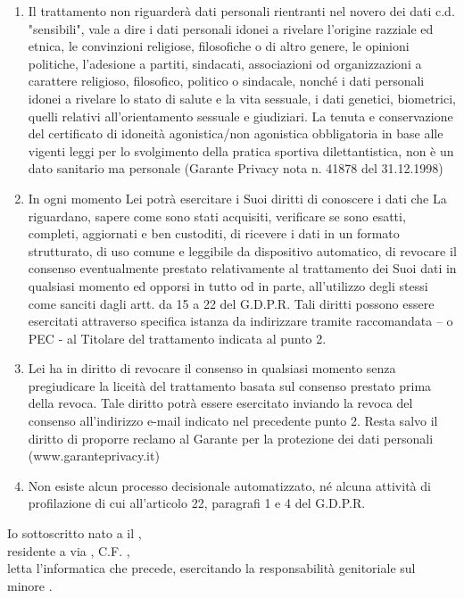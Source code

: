 \documentclass{djtsmod}
\begin{document}
\begin{enumerate}[wide, labelindent = 0pt, noitemsep, topsep = 0pt]
		\item Il trattamento non riguarderà dati personali rientranti nel novero dei dati c.d. "sensibili", vale a dire i dati personali idonei a rivelare l'origine razziale ed etnica, le convinzioni religiose, filosofiche o di altro genere, le opinioni politiche, l'adesione a partiti, sindacati, associazioni od organizzazioni a carattere religioso, filosofico, politico o sindacale, nonché i dati personali idonei a rivelare lo stato di salute e la vita sessuale, i dati genetici, biometrici, quelli relativi all'orientamento sessuale e giudiziari. La tenuta e conservazione del certificato di idoneità agonistica/non agonistica obbligatoria in base alle vigenti leggi per lo svolgimento della pratica sportiva dilettantistica, non è un dato sanitario ma personale (Garante Privacy nota n. 41878 del 31.12.1998)
		\item In ogni momento Lei potrà esercitare i Suoi diritti di conoscere i dati che La riguardano, sapere come sono stati acquisiti, verificare se sono esatti, completi, aggiornati e ben custoditi, di ricevere i dati in un formato strutturato, di uso comune e leggibile da dispositivo automatico, di revocare il consenso eventualmente prestato relativamente al trattamento dei Suoi dati in qualsiasi momento ed opporsi in tutto od in parte, all'utilizzo degli stessi come sanciti dagli artt. da 15 a 22 del G.D.P.R. Tali diritti possono essere esercitati attraverso specifica istanza da indirizzare tramite raccomandata – o PEC - al Titolare del trattamento indicata al punto 2.
		\item Lei ha in diritto di revocare il consenso in qualsiasi momento senza pregiudicare la liceità del trattamento basata sul consenso prestato prima della revoca. Tale diritto potrà essere esercitato inviando la revoca del consenso all'indirizzo e-mail indicato nel precedente punto 2. Resta salvo il diritto di proporre reclamo al Garante per la protezione dei dati personali (www.garanteprivacy.it)
		\item Non esiste alcun processo decisionale automatizzato, né alcuna attività di profilazione di cui all'articolo 22, paragrafi 1 e 4 del G.D.P.R.
	\end{enumerate}
	
	\fontsize{9pt}{10pt}\selectfont
	
	Io sottoscritto \fieldfill\; nato a \field{1.5in} il \field{1.5in}, \\ residente a \field{1.5in} via \fieldfill, C.F. \field{2in}, \\
	letta l'informatica che precede, esercitando la responsabilità genitoriale sul minore \fieldfill.
	
\end{document}
